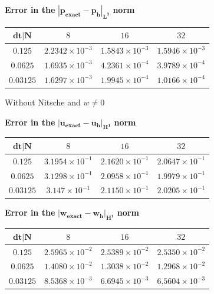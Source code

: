 \documentclass[11pt,a4paper,titlepage]{report}
\begin{document}
\begin{center}
\textbf{Error in the } $ \mathbf{ | p_{exact} - p_h |_{L^2}}$ \textbf{norm}
\begin{tabular}{| c | c | c | c |}
\hline
$\mathbf{dt | N}$ & $8$ & $16$ & $32$ \\
\hline
$ 0.125 $ & $2.2342 \times 10^{-3}$ & $1.5843 \times 10^{-3}$ &  $ 1.5946 \times 10^{-3}$ \\
\hline
$ 0.0625$ & $1.6935  \times 10^{-3}$ & $4.2361 \times 10^{-4}$ &  $ 3.9789  \times 10^{-4}$ \\
\hline
$ 0.03125 $ & $ 1.6297 \times 10^{-3}$ & $1.9945 \times 10^{-4}$ & $ 1.0166 \times 10^{-4}$ \\
\hline
\end{tabular}
\end{center}

Without Nitsche and $w \ne 0$

\begin{center}
\textbf{Error in the } $ \mathbf{ | u_{exact} - u_h |_{H^1}}$ \textbf{norm}
\begin{tabular}{| c | c | c | c |}
\hline
$\mathbf{dt | N}$ & $8$ & $16$ & $32$ \\
\hline
$ 0.125 $ & $3.1954 \times 10^{-1}$ & $2.1620 \times 10^{-1}$ &  $ 2.0647 \times 10^{-1}$ \\
\hline
$ 0.0625$ & $3.1298  \times 10^{-1}$ & $2.0958 \times 10^{-1}$ &  $ 1.9979  \times 10^{-1}$ \\
\hline
$ 0.03125 $ & $ 3.147 \times 10^{-1}$ & $2.1150 \times 10^{-1}$ & $ 2.0205 \times 10^{-1}$ \\
\hline
\end{tabular}
\end{center}

\begin{center}
\textbf{Error in the } $ \mathbf{ | w_{exact} - w_h |_{H^1}}$ \textbf{norm}
\begin{tabular}{| c | c | c | c |}
\hline
$\mathbf{dt | N}$ & $8$ & $16$ & $32$ \\
\hline
$ 0.125 $ & $2.5965 \times 10^{-2}$ & $2.5389 \times 10^{-2}$ &  $ 2.5350 \times 10^{-2}$ \\
\hline
$ 0.0625$ & $1.4080  \times 10^{-2}$ & $1.3038 \times 10^{-2}$ &  $ 1.2968  \times 10^{-2}$ \\
\hline
$ 0.03125 $ & $ 8.5368 \times 10^{-3}$ & $6.6945 \times 10^{-3}$ & $ 6.5604 \times 10^{-3}$ \\
\hline
\end{tabular}
\end{center}
\end{document}
